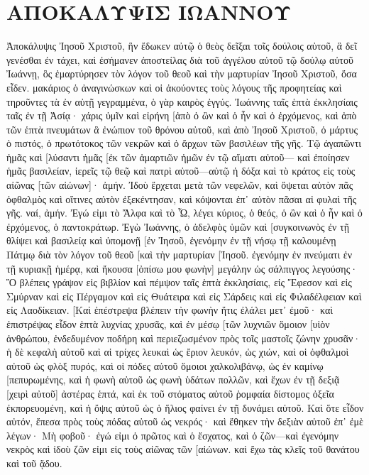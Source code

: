 \section{ΑΠΟΚΑΛΥΨΙΣ ΙΩΑΝΝΟΥ}
Ἀποκάλυψις Ἰησοῦ Χριστοῦ, ἣν ἔδωκεν αὐτῷ ὁ θεὸς δεῖξαι τοῖς δούλοις αὐτοῦ, ἃ δεῖ γενέσθαι ἐν τάχει, καὶ ἐσήμανεν ἀποστείλας διὰ τοῦ ἀγγέλου αὐτοῦ τῷ δούλῳ αὐτοῦ Ἰωάννῃ, 
ὃς ἐμαρτύρησεν τὸν λόγον τοῦ θεοῦ καὶ τὴν μαρτυρίαν Ἰησοῦ Χριστοῦ, ὅσα εἶδεν. 
μακάριος ὁ ἀναγινώσκων καὶ οἱ ἀκούοντες τοὺς λόγους τῆς προφητείας καὶ τηροῦντες τὰ ἐν αὐτῇ γεγραμμένα, ὁ γὰρ καιρὸς ἐγγύς. 
Ἰωάννης ταῖς ἑπτὰ ἐκκλησίαις ταῖς ἐν τῇ Ἀσίᾳ· χάρις ὑμῖν καὶ εἰρήνη [ἀπὸ ὁ ὢν καὶ ὁ ἦν καὶ ὁ ἐρχόμενος, καὶ ἀπὸ τῶν ἑπτὰ πνευμάτων ἃ ἐνώπιον τοῦ θρόνου αὐτοῦ, 
καὶ ἀπὸ Ἰησοῦ Χριστοῦ, ὁ μάρτυς ὁ πιστός, ὁ πρωτότοκος τῶν νεκρῶν καὶ ὁ ἄρχων τῶν βασιλέων τῆς γῆς. Τῷ ἀγαπῶντι ἡμᾶς καὶ [λύσαντι ἡμᾶς [ἐκ τῶν ἁμαρτιῶν ἡμῶν ἐν τῷ αἵματι αὐτοῦ— 
καὶ ἐποίησεν ἡμᾶς βασιλείαν, ἱερεῖς τῷ θεῷ καὶ πατρὶ αὐτοῦ—αὐτῷ ἡ δόξα καὶ τὸ κράτος εἰς τοὺς αἰῶνας [τῶν αἰώνων]· ἀμήν. 
Ἰδοὺ ἔρχεται μετὰ τῶν νεφελῶν, καὶ ὄψεται αὐτὸν πᾶς ὀφθαλμὸς καὶ οἵτινες αὐτὸν ἐξεκέντησαν, καὶ κόψονται ἐπ᾽ αὐτὸν πᾶσαι αἱ φυλαὶ τῆς γῆς. ναί, ἀμήν. 
Ἐγώ εἰμι τὸ Ἄλφα καὶ τὸ Ὦ, λέγει κύριος, ὁ θεός, ὁ ὢν καὶ ὁ ἦν καὶ ὁ ἐρχόμενος, ὁ παντοκράτωρ. 
Ἐγὼ Ἰωάννης, ὁ ἀδελφὸς ὑμῶν καὶ [συγκοινωνὸς ἐν τῇ θλίψει καὶ βασιλείᾳ καὶ ὑπομονῇ [ἐν Ἰησοῦ, ἐγενόμην ἐν τῇ νήσῳ τῇ καλουμένῃ Πάτμῳ διὰ τὸν λόγον τοῦ θεοῦ [καὶ τὴν μαρτυρίαν [Ἰησοῦ. 
ἐγενόμην ἐν πνεύματι ἐν τῇ κυριακῇ ἡμέρᾳ, καὶ ἤκουσα [ὀπίσω μου φωνὴν] μεγάλην ὡς σάλπιγγος 
λεγούσης· Ὃ βλέπεις γράψον εἰς βιβλίον καὶ πέμψον ταῖς ἑπτὰ ἐκκλησίαις, εἰς Ἔφεσον καὶ εἰς Σμύρναν καὶ εἰς Πέργαμον καὶ εἰς Θυάτειρα καὶ εἰς Σάρδεις καὶ εἰς Φιλαδέλφειαν καὶ εἰς Λαοδίκειαν. 
[Καὶ ἐπέστρεψα βλέπειν τὴν φωνὴν ἥτις ἐλάλει μετ᾽ ἐμοῦ· καὶ ἐπιστρέψας εἶδον ἑπτὰ λυχνίας χρυσᾶς, 
καὶ ἐν μέσῳ [τῶν λυχνιῶν ὅμοιον [υἱὸν ἀνθρώπου, ἐνδεδυμένον ποδήρη καὶ περιεζωσμένον πρὸς τοῖς μαστοῖς ζώνην χρυσᾶν· 
ἡ δὲ κεφαλὴ αὐτοῦ καὶ αἱ τρίχες λευκαὶ ὡς ἔριον λευκόν, ὡς χιών, καὶ οἱ ὀφθαλμοὶ αὐτοῦ ὡς φλὸξ πυρός, 
καὶ οἱ πόδες αὐτοῦ ὅμοιοι χαλκολιβάνῳ, ὡς ἐν καμίνῳ [πεπυρωμένης, καὶ ἡ φωνὴ αὐτοῦ ὡς φωνὴ ὑδάτων πολλῶν, 
καὶ ἔχων ἐν τῇ δεξιᾷ [χειρὶ αὐτοῦ] ἀστέρας ἑπτά, καὶ ἐκ τοῦ στόματος αὐτοῦ ῥομφαία δίστομος ὀξεῖα ἐκπορευομένη, καὶ ἡ ὄψις αὐτοῦ ὡς ὁ ἥλιος φαίνει ἐν τῇ δυνάμει αὐτοῦ. 
Καὶ ὅτε εἶδον αὐτόν, ἔπεσα πρὸς τοὺς πόδας αὐτοῦ ὡς νεκρός· καὶ ἔθηκεν τὴν δεξιὰν αὐτοῦ ἐπ᾽ ἐμὲ λέγων· Μὴ φοβοῦ· ἐγώ εἰμι ὁ πρῶτος καὶ ὁ ἔσχατος, 
καὶ ὁ ζῶν—καὶ ἐγενόμην νεκρὸς καὶ ἰδοὺ ζῶν εἰμι εἰς τοὺς αἰῶνας τῶν [αἰώνων. καὶ ἔχω τὰς κλεῖς τοῦ θανάτου καὶ τοῦ ᾅδου. 
